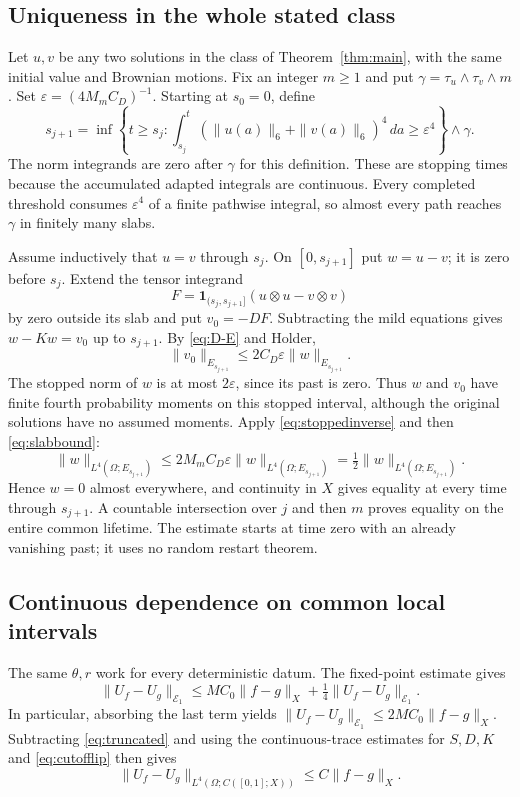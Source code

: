 \documentclass[11pt]{article}
\numberwithin{equation}{section}
\begin{document}
\subsection{Uniqueness in the whole stated class}
Let $u,v$ be any two solutions in the class of Theorem~\ref{thm:main},
with the same initial value and Brownian motions. Fix an integer $m\geq1$
and put $\gamma=\tau_u\wedge\tau_v\wedge m$.
Set $\varepsilon=(4M_mC_D)^{-1}$. Starting at $s_0=0$, define
\[
 s_{j+1}=\inf\left\{t\geq s_j:
   \int_{s_j}^t(\|u(a)\|_6+\|v(a)\|_6)^4\,da
                      \geq\varepsilon^4\right\}\wedge\gamma.
\]
The norm integrands are zero after $\gamma$ for this definition.
These are stopping times because the accumulated adapted integrals are
continuous. Every completed threshold consumes $\varepsilon^4$ of a finite
pathwise integral, so almost every path reaches $\gamma$ in finitely many
slabs.

Assume inductively that $u=v$ through $s_j$. On $[0,s_{j+1}]$ put $w=u-v$;
it is zero before $s_j$. Extend the tensor integrand
\[
 F=\mathbf1_{(s_j,s_{j+1}]}(u\otimes u-v\otimes v)
\]
by zero outside its slab and put $v_0=-DF$. Subtracting the mild equations
gives $w-Kw=v_0$ up to $s_{j+1}$. By \eqref{eq:D-E} and Holder,
\begin{equation}\label{eq:slabbound}
 \|v_0\|_{E_{s_{j+1}}}
 \leq2C_D\varepsilon\|w\|_{E_{s_{j+1}}}.
\end{equation}
The stopped norm of $w$ is at most $2\varepsilon$, since its past is zero.
Thus $w$ and $v_0$ have finite fourth probability moments on this stopped
interval, although the original solutions have no assumed moments.
Apply \eqref{eq:stoppedinverse} and then \eqref{eq:slabbound}:
\[
 \|w\|_{L^4(\Omega;E_{s_{j+1}})}
 \leq2M_mC_D\varepsilon\|w\|_{L^4(\Omega;E_{s_{j+1}})}
 =\tfrac12\|w\|_{L^4(\Omega;E_{s_{j+1}})}.
\]
Hence $w=0$ almost everywhere, and continuity in $X$ gives equality at
every time through $s_{j+1}$. A countable intersection over $j$ and then
$m$ proves equality on the entire common lifetime. The estimate starts at
time zero with an already vanishing past; it uses no random restart theorem.

\subsection{Continuous dependence on common local intervals}
The same $\theta,r$ work for every deterministic datum. The fixed-point
estimate gives
\begin{equation}\label{eq:Estability}
 \|U_f-U_g\|_{\mathcal E_1}
 \leq MC_0\|f-g\|_X+\tfrac14\|U_f-U_g\|_{\mathcal E_1}.
\end{equation}
In particular, absorbing the last term yields
$\|U_f-U_g\|_{\mathcal E_1}\leq2MC_0\|f-g\|_X$.
Subtracting \eqref{eq:truncated} and using the continuous-trace estimates
for $S,D,K$ and \eqref{eq:cutofflip} then gives
\begin{equation}\label{eq:Xstability}
 \|U_f-U_g\|_{L^4(\Omega;C([0,1];X))}\leq C\|f-g\|_X.
\end{equation}
\end{document}
